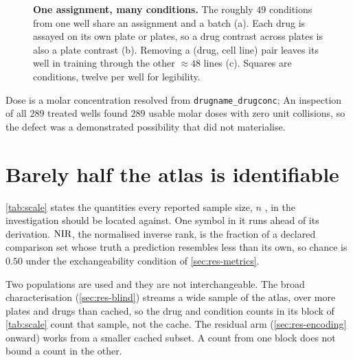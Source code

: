 \begin{figure}[htbp]
\centering

\caption[The well is the unit the atlas actually assigns]{\textbf{One
assignment, many conditions.} The roughly $49$ conditions from one well share
an assignment and a batch (a). Each drug is assayed on its own plate or plates,
so a drug contrast across plates is also a plate contrast (b). Removing a (drug,
cell line) pair leaves its well in training through the other $\approx 48$ lines
(c). Squares are conditions, twelve per well for legibility.}
\label{fig:confound}
\end{figure}


Dose is a molar concentration resolved from \texttt{drugname\_drugconc}; An inspection of all $289$ treated wells found $289$ usable molar doses
with zero unit collisions, so the defect was a demonstrated possibility that did
not materialise. 


\section{Barely half the atlas is identifiable}

\cref{tab:scale} states the quantities every reported sample size, $n$ , in the investigation should be
located against. One symbol in it runs ahead of its
derivation. $\textrm{NIR}$, the normalised inverse rank, is the
fraction of a declared comparison set whose truth a prediction resembles less
than its own, so chance is $0.50$ under the exchangeability condition of
\cref{sec:res-metrics}.

\begin{scopelimit}
Two populations are used and they are not interchangeable. The broad
characterisation (\cref{sec:res-blind}) streams a wide sample of the atlas, over
more plates and drugs than cached, so the drug and condition counts in its block
of \cref{tab:scale} count that sample, not the cache. The residual arm
(\cref{sec:res-encoding} onward) works from a smaller cached subset. A count
from one block does not bound a count in the other.
\end{scopelimit}

